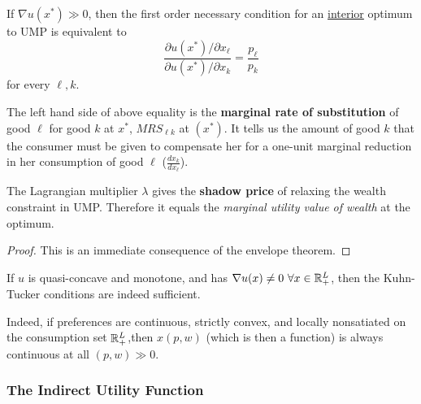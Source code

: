\documentclass{article}
\begin{document}
 			\begin{corollary}
 				If $\nabla u\left(x^{*}\right) \gg 0$, then the first order necessary condition for an \ul{interior} optimum to UMP is equivalent to 
 				\begin{equation}
 					\frac{\partial u\left(x^{*}\right) / \partial x_{\ell}}{\partial u\left(x^{*}\right) / \partial x_{k}}=\frac{p_{\ell}}{p_{k}}
 				\end{equation}
 				for every $\ell, k$.
 			\end{corollary}
 			
 			\begin{definition}
 				The left hand side of above equality is the \textbf{marginal rate of substitution} of good $\ell$ for good $k$ at $x^*$, $MRS_{\ell k}$ at $(x^*)$. It tells us the amount of good $k$ that the consumer must be given to compensate her for a one-unit marginal reduction in her consumption of good $\ell$ ($\frac{dx_k}{dx_\ell}$).
 			\end{definition}
 			
 			\begin{proposition}
 				The Lagrangian multiplier $\lambda$ gives the \textbf{shadow price} of relaxing the wealth constraint in UMP. Therefore it equals the \emph{marginal utility value of wealth} at the optimum.
 			\end{proposition}
 			
 			\begin{proof}
 				This is an immediate consequence of the envelope theorem.
 			\end{proof}
 			
 			\begin{proposition}
 				If $u$ is quasi-concave and monotone, and has $\nabla u(x) \neq 0\ \forall x \in \mathbb{R}^L_+$, then the Kuhn-Tucker conditions are indeed sufficient.
 			\end{proposition}
 			
 			\begin{proposition}
 				Indeed, if preferences are continuous, strictly convex, and locally nonsatiated on the consumption set $\mathbb{R}^L_+$,then $x(p, w)$ (which is then a function) is always continuous at all $(p, w) \gg 0$.
 			\end{proposition}
 			
 			\subsubsection{The Indirect Utility Function}
 			
\end{document}
